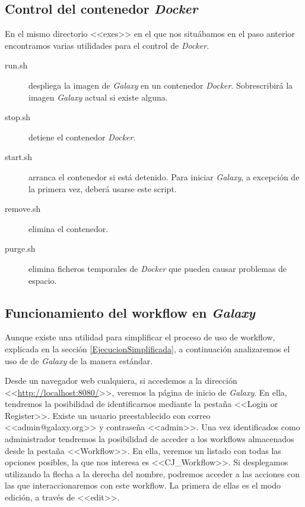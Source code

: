\subsection{Control del contenedor \textit{Docker}}
En el mismo directorio <<exes>> en el que nos situábamos en el paso anterior encontramos varias utilidades para el control de \textit{Docker}.
\begin{description}
    \item[run.sh] despliega la imagen de \textit{Galaxy} en un contenedor \textit{Docker}. Sobrescribirá la imagen \textit{Galaxy} actual si existe alguna.
    \item[stop.sh] detiene el contenedor \textit{Docker}.
    \item[start.sh] arranca el contenedor si está detenido. Para iniciar \textit{Galaxy}, a excepción de la primera vez, deberá usarse este script.
    \item[remove.sh] elimina el contenedor.
    \item[purge.sh] elimina ficheros temporales de \textit{Docker} que pueden causar problemas de espacio.
\end{description}


\subsection{Funcionamiento del workflow en \textit{Galaxy}}
Aunque existe una utilidad para simplificar el proceso de uso de workflow, explicada en la sección \ref{EjecucionSimplificada}, a continuación analizaremos el uso de de \textit{Galaxy} de la manera estándar.

Desde un navegador web cualquiera, si accedemos a la dirección <<\url{http://localhost:8080/}>>, veremos la página de inicio de \textit{Galaxy}. En ella, tendremos la posibilidad de identificarnos mediante la pestaña <<Login or Register>>. Existe un usuario preestablecido con correo <<admin@galaxy.org>> y contraseña <<admin>>. Una vez identificados como administrador tendremos la posibilidad de acceder a los workflows almacenados desde la pestaña <<Workflow>>. En ella, veremos un listado con todas las opciones posibles, la que nos interesa es <<CJ\_Workflow>>. Si desplegamos utilizando la flecha a la derecha del nombre, podremos acceder a las acciones con las que interaccionaremos con este workflow. La primera de ellas es el modo edición, a través de <<edit>>. 

